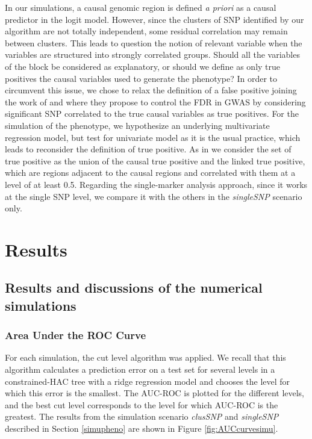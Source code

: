 \documentclass[]{book}
\begin{document}
In our simulations, a causal genomic region is defined \emph{a priori} as a
causal predictor in the logit model. However, since the clusters of SNP
identified by our algorithm are not totally independent, some residual
correlation may remain between clusters. This leads to question the
notion of relevant variable when the variables are structured into
strongly correlated groups. Should all the variables of the block be
considered as explanatory, or should we define as only true positives
the causal variables used to generate the phenotype? In order to
circumvent this issue, we chose to relax the definition of a false
positive joining the work of \citep{brzyski_controlling_2017} and
\citep{yi2015penalized} where they propose to control the FDR in GWAS by
considering significant SNP correlated to the true causal variables as
true positives. For the simulation of the phenotype, we hypothesize an
underlying multivariate regression model, but test for univariate model
as it is the usual practice, which leads to reconsider the definition of
true positive. As in \citep{yi2015penalized} we consider the set of true
positive as the union of the causal true positive and the linked true
positive, which are regions adjacent to the causal regions and
correlated with them at a level of at least 0.5. Regarding the
single-marker analysis approach, since it works at the single SNP level,
we compare it with the others in the \emph{singleSNP} scenario only.

\hypertarget{results}{%
\section{Results}\label{results}}

\hypertarget{results-and-discussions-of-the-numerical-simulations}{%
\subsection{Results and discussions of the numerical simulations}\label{results-and-discussions-of-the-numerical-simulations}}

\hypertarget{area-under-the-roc-curve}{%
\subsubsection{Area Under the ROC Curve}\label{area-under-the-roc-curve}}

For each simulation, the cut level algorithm was applied. We recall that
this algorithm calculates a prediction error on a test set for several
levels in a constrained-HAC tree with a ridge regression model and
chooses the level for which this error is the smallest. The AUC-ROC is
plotted for the different levels, and the best cut level corresponds to
the level for which AUC-ROC is the greatest. The results from the
simulation scenario \emph{clusSNP} and \emph{singleSNP} described in Section
\ref{simupheno} are shown in Figure \ref{fig:AUCcurvesimu}.
\end{document}
